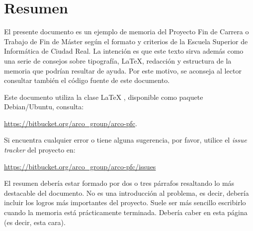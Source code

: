 
\chapter{Resumen}

El presente documento es un ejemplo de memoria del Proyecto Fin de Carrera o Trabajo de
Fin de Máster según el formato y criterios de la Escuela Superior de Informática de Ciudad
Real. La intención es que este texto sirva además como una serie de consejos sobre
tipografía, \LaTeX, redacción y estructura de la memoria que podrían resultar de
ayuda. Por este motivo, se aconseja al lector consultar también el código fuente de este
documento.

Este documento utiliza la clase \LaTeX{} \arcopfc{}, disponible como paquete
Debian/Ubuntu, consulta:

 \url{https://bitbucket.org/arco_group/arco-pfc}.

Si encuentra cualquier error o tiene alguna sugerencia, por favor, utilice
el \emph{issue tracker} del proyecto \arcopfc{} en:

\url{https://bitbucket.org/arco_group/arco-pfc/issues}

El resumen debería estar formado por dos o tres párrafos resaltando lo más
destacable del documento. No es una introducción al problema, es decir, debería
incluir los logros más importantes del proyecto. Suele ser más sencillo
escribirlo cuando la memoria está prácticamente terminada. Debería caber en esta
página (es decir, esta cara).


